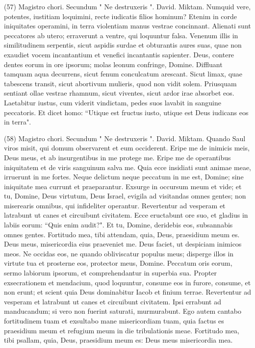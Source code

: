 \begin{biblechapter}  (57) 
\verse  Magistro chori. Secundum " Ne destruxeris ". David. Miktam. 
\verse Numquid vere, potentes, iustitiam loquimini, recte iudicatis filios hominum? 
\verse Etenim in corde iniquitates operamini, in terra violentiam manus vestrae concinnant. 
\verse Alienati sunt peccatores ab utero; erraverunt a ventre, qui loquuntur falsa. 
\verse Venenum illis in similitudinem serpentis, sicut aspidis surdae et obturantis aures suas, 
\verse quae non exaudiet vocem incantantium et venefici incantantis sapienter. 
\verse Deus, contere dentes eorum in ore ipsorum; molas leonum confringe, Domine. 
\verse Diffluant tamquam aqua decurrens, sicut fenum conculcatum arescant. 
\verse Sicut limax, quae tabescens transit, sicut abortivum mulieris, quod non vidit solem. 
\verse Priusquam sentiant ollae vestrae rhamnum, sicut viventes, sicut ardor irae absorbet eos. 
\verse Laetabitur iustus, cum viderit vindictam, pedes suos lavabit in sanguine peccatoris. 
\verse Et dicet homo: “Utique est fructus iusto, utique est Deus iudicans eos in terra". 
\end{biblechapter}

\begin{biblechapter}  (58) 
\verse  Magistro chori. Secundum " Ne destruxeris ". David. Miktam. Quando Saul viros misit, qui domum observarent et eum occiderent. 
\verse Eripe me de inimicis meis, Deus meus, et ab insurgentibus in me protege me. 
\verse Eripe me de operantibus iniquitatem et de viris sanguinum salva me. 
\verse Quia ecce insidiati sunt animae meae, irruerunt in me fortes. 
\verse Neque delictum neque peccatum in me est, Domine; sine iniquitate mea currunt et praeparantur. Exsurge in occursum meum et vide; 
\verse et tu, Domine, Deus virtutum, Deus Israel, evigila ad visitandas omnes gentes; non miserearis omnibus, qui infideliter operantur. 
\verse Revertentur ad vesperam et latrabunt ut canes et circuibunt civitatem. 
\verse Ecce eructabunt ore suo, et gladius in labiis eorum: “Quis enim audit?". 
\verse Et tu, Domine, deridebis eos, subsannabis omnes gentes. 
\verse Fortitudo mea, tibi attendam, quia, Deus, praesidium meum es. 
\verse Deus meus, misericordia eius praeveniet me. Deus faciet, ut despiciam inimicos meos. 
\verse Ne occidas eos, ne quando obliviscatur populus meus; disperge illos in virtute tua et prosterne eos, protector meus, Domine. 
\verse Peccatum oris eorum, sermo labiorum ipsorum, et comprehendantur in superbia sua. Propter exsecrationem et mendacium, quod loquuntur, 
\verse consume eos in furore, consume, et non erunt; et scient quia Deus dominabitur Iacob et finium terrae. 
\verse Revertentur ad vesperam et latrabunt ut canes et circuibunt civitatem. 
\verse Ipsi errabunt ad manducandum; si vero non fuerint saturati, murmurabunt. 
\verse Ego autem cantabo fortitudinem tuam et exsultabo mane misericordiam tuam, quia factus es praesidium meum et refugium meum in die tribulationis meae. 
\verse Fortitudo mea, tibi psallam, quia, Deus, praesidium meum es: Deus meus misericordia mea. 
\end{biblechapter}

